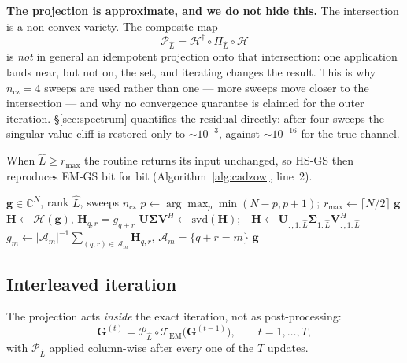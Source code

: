 \documentclass[journal]{IEEEtran}
\newcommand{\bG}{\mathbf{G}}
\newcommand{\bU}{\mathbf{U}}
\newcommand{\bV}{\mathbf{V}}
\newcommand{\bH}{\mathbf{H}}
\newcommand{\bg}{\mathbf{g}}
\newcommand{\Hank}{\mathcal{H}}
\newcommand{\rmax}{r_{\max}}
\begin{document}
\textbf{The projection is approximate, and we do not hide this.} The
intersection is a non-convex variety. The composite map
\begin{equation}\label{eq:notproj}
\mathcal{P}_{\hat L}=\Hank^{\dagger}\circ\Pi_{\hat L}\circ\Hank
\end{equation}
is \emph{not} in general an idempotent projection onto that intersection: one
application lands near, but not on, the set, and iterating changes the result.
This is why $n_{\mathrm{cz}}=4$ sweeps are used rather than one --- more sweeps
move closer to the intersection --- and why no convergence guarantee is claimed
for the outer iteration. \S\ref{sec:spectrum} quantifies the residual
directly: after four sweeps the singular-value cliff is restored only to
$\sim\!10^{-3}$, against $\sim\!10^{-16}$ for the true channel.

When $\hat L\ge\rmax$ the routine returns its input unchanged, so HS-GS then
reproduces EM-GS bit for bit (Algorithm~\ref{alg:cadzow}, line~2).

\begin{algorithm}[!t]
\caption{Cadzow projection $\mathcal{P}_{\hat L}$ of one channel column}
\label{alg:cadzow}
\begin{algorithmic}[1]
\Require $\bg\in\mathbb{C}^{N}$, rank $\hat L$, sweeps $n_{\mathrm{cz}}$
\State $p\leftarrow\arg\max_{p}\min(N-p,p+1)$;\quad
       $\rmax\leftarrow\lceil N/2\rceil$
\If{$\hat L\ge\rmax$} \Return $\bg$
        \EndIf
{}
  \State $\bH\leftarrow\Hank(\bg)$, $\bH_{q,r}=g_{q+r}$
  \State $\bU\boldsymbol{\Sigma}\bV^{H}\leftarrow\mathrm{svd}(\bH)$;\ \
         $\bH\leftarrow\bU_{:,1:\hat L}\boldsymbol{\Sigma}_{1:\hat L}
         \bV_{:,1:\hat L}^{H}$ \Comment{rank}
  \State $g_m\leftarrow|\mathcal{A}_m|^{-1}\!\!\sum_{(q,r)\in\mathcal{A}_m}\!\!\bH_{q,r}$,
         $\mathcal{A}_m\!=\!\{q{+}r{=}m\}$ \Comment{Hankel}
\EndFor
\State \Return $\bg$
\end{algorithmic}
\end{algorithm}

\subsection{Interleaved iteration}

The projection acts \emph{inside} the exact iteration, not as post-processing:
\begin{equation}\label{eq:map}
\bG^{(t)}=\mathcal{P}_{\hat L}\circ\mathcal{T}_{\mathrm{EM}}
\bigl(\bG^{(t-1)}\bigr),\qquad t=1,\dots,T,
\end{equation}
with $\mathcal{P}_{\hat L}$ applied column-wise after every one of the $T$
updates.
\end{document}
